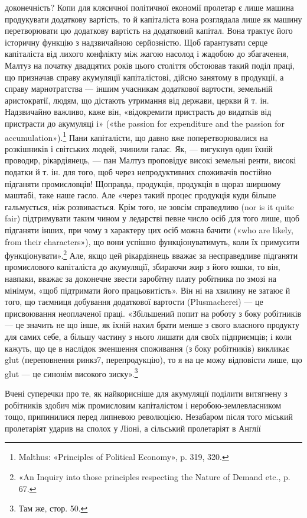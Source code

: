 доконечність? Копи для клясичної політичної економії пролетар
є лише машина продукувати додаткову вартість, то
й капіталіста вона розглядала лише як машину перетворювати
цю додаткову вартість на додатковий капітал. Вона трактує
його історичну функцію з надзвичайною серйозністю. Щоб ґарантувати
серце капіталіста від лихого конфлікту між жагою
насолод і жадобою до збагачення, Малтуз на початку двадцятих
років цього століття обстоював такий поділ праці, що призначав
справу акумуляції капіталістові, дійсно занятому в продукції,
а справу марнотратства — іншим учасникам додаткової вартости,
земельній аристократії, людям, що дістають утримання від держави,
церкви й т. ін. Надзвичайно важливо, каже він, «відокремити
пристрасть до видатків від пристрасти до акумуляці і» («the
passion for expenditure and the passion for accumulation»).\footnote{
Malthus: «Principles of Political Economy», p. 319, 320.
}
Пани капіталісти, що давно вже поперетворювалися на розкішників
і світських людей, зчинили галас. Як, — вигукнув один
їхній проводир, рікардіянець, — пан Малтуз проповідує високі
земельні ренти, високі податки й т. ін. для того, щоб через непродуктивних
споживачів постійно підганяти промисловців! Щоправда,
продукція, продукція в щораз ширшому маштабі, таке
наше гасло. Але «через такий процес продукція куди більше
гальмується, ніж розвивається. Крім того, не зовсім справедливо
(nor is it quite fair) підтримувати таким чином у ледарстві певне
число осіб для того лише, щоб підганяти інших, при чому з характеру
цих осіб можна бачити («who are likely, from their characters»),
що вони успішно функціонуватимуть, коли їх примусити
функціонувати».\footnote{
«An Inquiry into those principles respecting the Nature of Demand
etc., p. 67.
} Але, якщо цей рікардіянець вважає за несправедливе
підганяти промислового капіталіста до акумуляції,
збираючи жир з його юшки, то він, навпаки, вважає за доконечне
звести заробітну плату робітника по змозі на мінімум,
«щоб підтримати його працьовитість». Він ні на хвилину не
затаює й того, що таємниця добування додаткової вартости
(Plusmacherei) — це присвоювання неоплаченої праці. «Збільшений
попит на роботу з боку робітників — це значить не що
інше, як їхній нахил брати менше з свого власного продукту для
самих себе, а більшу частину з нього лишати для своїх підприємців;
і коли кажуть, що це в наслідок зменшення споживання
(з боку робітників) викликає glut (переповнення ринкз7, перепродукцію),
то я на це можу відповісти лише, що glut — це синонім
високого зиску».\footnote{
Там же, стор. 50.
}

Вчені суперечки про те, як найкорисніше для акумуляції
поділити витягнену з робітників здобич між промисловим капіталістом
і неробою-землевласником тощо, припинилися перед
липневою революцією. Незабаром після того міський пролетаріят
ударив на сполох у Ліоні, а сільський пролетаріят в Англії